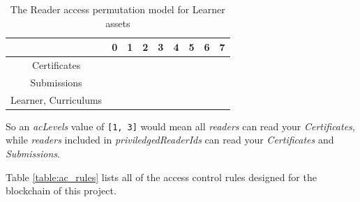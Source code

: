 \begin{table}[!ht]
	\caption{The Reader access permutation model for Learner assets}
	\centering
	\label{table:reader_permutations}
	\begin{tabular}{|c|c|c|c|c|c|c|c|c|}
		\hline
		                     & 0 & 1          & 2          & 3          & 4          & 5          & 6          & 7          \\
		\hline
		Certificates         &   & \checkmark &            & \checkmark &            & \checkmark &            & \checkmark \\
		\hline
		Submissions          &   &            & \checkmark & \checkmark &            &            & \checkmark & \checkmark \\
		\hline
		Learner, Curriculums &   &            &            &            & \checkmark & \checkmark & \checkmark & \checkmark \\
		\hline
	\end{tabular}
\end{table}

So an \textit{acLevels} value of \texttt{[1, 3]} would mean all \textit{readers} can read your \textit{Certificates},
while \textit{readers} included in \textit{priviledgedReaderIds} can read your \textit{Certificates} and \textit{Submissions}.

Table \ref{table:ac_rules} lists all of the access control rules designed for the blockchain of this project.

